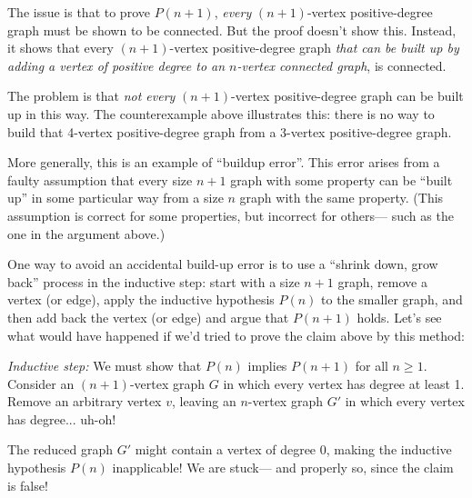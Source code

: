 \begin{notesproblem}
{The issue is that to prove $P(n+1)$, \emph{every} $(n+1)$-vertex
positive-degree graph must be shown to be connected.  But the proof
doesn't show this.  Instead, it shows that every $(n+1)$-vertex
positive-degree graph \emph{that can be built up by adding a vertex of
positive degree to an $n$-vertex connected graph}, is connected.

The problem is that \emph{not every} $(n+1)$-vertex positive-degree graph
can be built up in this way.  The counterexample above illustrates this:
there is no way to build that 4-vertex positive-degree graph from a
3-vertex positive-degree graph.

More generally, this is an example of ``buildup error''.  This error
arises from a faulty assumption that every size $n+1$ graph with some
property can be ``built up'' in some particular way from a size $n$ graph
with the same property.  (This assumption is correct for some properties,
but incorrect for others--- such as the one in the argument above.)

One way to avoid an accidental build-up error is to use a ``shrink
down, grow back'' process in the inductive step: start with a size
$n+1$ graph, remove a vertex (or edge), apply the inductive hypothesis
$P(n)$ to the smaller graph, and then add back the vertex (or edge)
and argue that $P(n+1)$ holds.  Let's see what would have happened if
we'd tried to prove the claim above by this method:

\noindent \textit{Inductive step:} We must show that $P(n)$ implies
$P(n+1)$ for all $n \geq 1$.  Consider an $(n+1)$-vertex graph $G$ in
which every vertex has degree at least 1.  Remove an arbitrary vertex
$v$, leaving an $n$-vertex graph $G'$ in which every vertex has
degree... uh-oh!

The reduced graph $G'$ might contain a vertex of degree 0, making the
inductive hypothesis $P(n)$ inapplicable!  We are stuck--- and
properly so, since the claim is false!}

\eparts
\end{notesproblem}

\endinput
